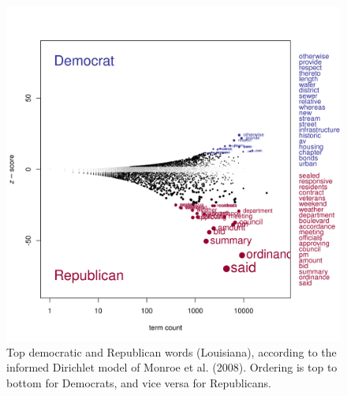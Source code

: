 \documentclass[11pt]{article}
\begin{document}
\begin{figure}[!ht]
	\centering %
	\caption{Top democratic and Republican words (Louisiana), according to the informed Dirichlet model of Monroe et al. (2008). Ordering is top to bottom for Democrats, and vice versa for Republicans.}
	\label{fightinwordsLA}
	\includegraphics[width=\linewidth]{figures/fightinWordsLA.png}
\end{figure}






\end{document}
